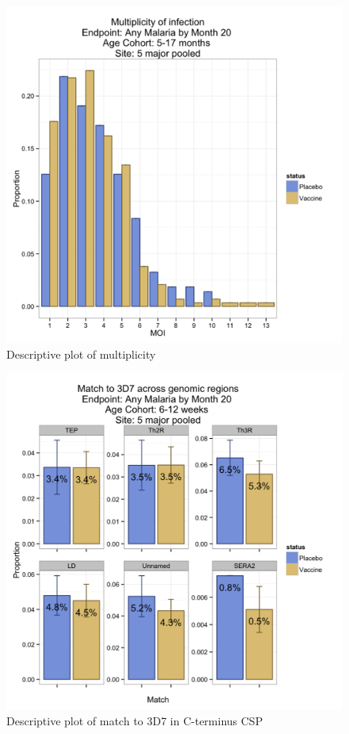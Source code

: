 \documentclass[]{article}
\begin{document}
\begin{figure}[htbp]
\centering
\includegraphics{figures/moi-infant-x-1.png}
\caption{Descriptive plot of multiplicity}
\end{figure}

\begin{figure}[htbp]
\centering
\includegraphics{figures/match-newborn-x-1.png}
\caption{Descriptive plot of match to 3D7 in C-terminus CSP}
\end{figure}
\end{document}
